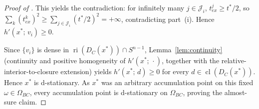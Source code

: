\documentclass[10pt,a4paper]{amsart}
\DeclareMathOperator{\cl}{cl}
\DeclareMathOperator{\ri}{ri}
\begin{document}
\begin{proof}[Proof of ]
This yields the contradiction: for infinitely many $j \in \mathcal{J}_i$, $t^j_{ex} \geq t^*/2$, so $\sum_k (t^k_{ex})^2 \geq \sum_{j \in \mathcal{J}_i}(t^*/2)^2 = +\infty$, contradicting part~(i). Hence $h'(x^*;\, v_i) \geq 0$.


Since $\{v_i\}$ is dense in $\ri(D_C(x^*)) \cap S^{n-1}$, Lemma~\ref{lem:continuity} (continuity and positive homogeneity of $h'(x^*;\, \cdot)$, together with the relative-interior-to-closure extension) yields $h'(x^*;\, d) \geq 0$ for every $d \in \cl(D_C(x^*))$. Hence $x^*$ is d-stationary. As $x^*$ was an arbitrary accumulation point on this fixed $\omega \in \Omega_{BC}$, every accumulation point is d-stationary on $\Omega_{BC}$, proving the almost-sure claim.
\end{proof}
\end{document}
